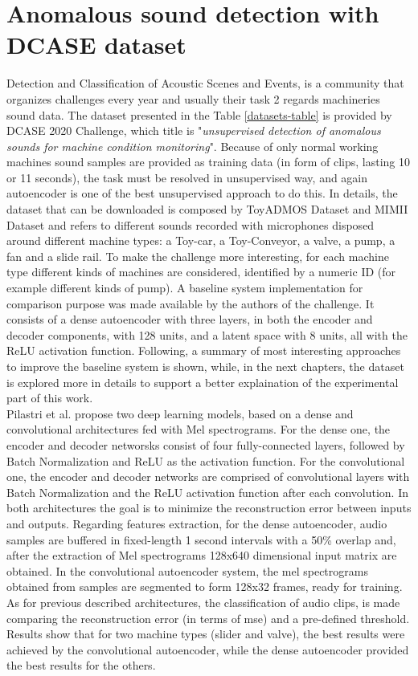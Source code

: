 \section{Anomalous sound detection with DCASE dataset}
Detection and Classification of Acoustic Scenes and Events, is a community that organizes challenges every year and usually their task 2 regards machineries sound data. The dataset presented in the Table \ref{datasets-table} is provided by DCASE 2020 Challenge, which title is "\textit{unsupervised detection of anomalous sounds for machine condition monitoring}". Because of only normal working machines sound samples are provided as training data (in form of clips, lasting 10 or 11 seconds), the task must be resolved in unsupervised way, and again autoencoder is one of the best unsupervised approach to do this. In details, the dataset that can be downloaded is composed by ToyADMOS Dataset and MIMII Dataset \cite{DCASE} and refers to different sounds recorded with microphones disposed around different machine types: a Toy-car, a Toy-Conveyor, a valve, a pump, a fan and a slide rail. To make the challenge more interesting, for each machine type different kinds of machines are considered, identified by a numeric ID (for example different kinds of pump). A baseline system implementation for comparison purpose was made available by the authors of the challenge. It consists of a dense autoencoder with three layers, in both the encoder and decoder components, with 128 units, and a latent space with 8 units, all with the ReLU activation function. Following, a summary of most interesting approaches to improve the baseline system is shown, while, in the next chapters, the dataset is explored more in details to support a better explaination of the experimental part of this work.\\
Pilastri et al. \cite{15DeepDenseConvAE} propose two deep learning models, based on a dense and convolutional architectures fed with Mel spectrograms. For the dense one, the encoder and decoder networsks consist of four fully-connected layers, followed by Batch Normalization and ReLU as the activation function. For the convolutional one, the encoder and decoder networks are comprised of convolutional layers with Batch Normalization and the ReLU activation function after each convolution. In both architectures the goal is to minimize the reconstruction error between inputs and outputs. Regarding features extraction, for the dense autoencoder, audio samples are buffered in fixed-length 1 second intervals with a 50\% overlap and, after the extraction of Mel spectrograms 128x640 dimensional input matrix are obtained. In the convolutional autoencoder system, the mel spectrograms obtained from samples are segmented to form 128x32 frames, ready for training. As for previous described architectures, the classification of audio clips, is made comparing the reconstruction error (in terms of mse) and a pre-defined threshold. Results show that for two machine types (slider and valve), the best results were achieved by the convolutional autoencoder, while the dense autoencoder provided the best results for the others.\\
